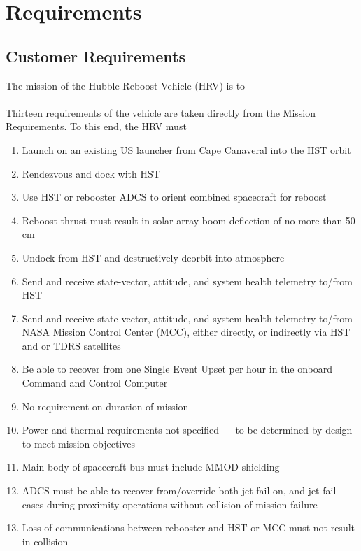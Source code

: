 \documentclass[paper=letter, fontsize=11pt]{scrartcl} %
\numberwithin{equation}{section} %
\numberwithin{figure}{section} %
\numberwithin{table}{section} %
\begin{document}
\section{Requirements} \label{section:reqs}

\subsection{Customer Requirements}

The mission of the Hubble Reboost Vehicle (HRV) is to
 \\
\\
Thirteen requirements of the vehicle are taken directly from the Mission Requirements. To this end, the HRV must
\begin{enumerate}[label=(\alph*)]
    \item Launch on an existing US launcher from Cape Canaveral into the HST orbit
    \item Rendezvous and dock with HST
    \item Use HST or rebooster ADCS to orient combined spacecraft for reboost
    \item Reboost thrust must result in solar array boom deflection of no more than 50 cm
    \item Undock from HST and destructively deorbit into atmosphere
    \item Send and receive state-vector, attitude, and system health telemetry to/from HST
    \item Send and receive state-vector, attitude, and system health telemetry to/from NASA Mission Control Center (MCC), either directly, or indirectly via HST and or TDRS satellites
    \item Be able to recover from one Single Event Upset per hour in the onboard Command and Control Computer
    \item No requirement on duration of mission
    \item Power and thermal requirements not specified --- to be determined by design to meet mission objectives
    \item Main body of spacecraft bus must include MMOD shielding
    \item ADCS must be able to recover from/override both jet-fail-on, and jet-fail cases during proximity operations without collision of mission failure
    \item Loss of communications between rebooster and HST or MCC must not result in collision
\end{enumerate}
\end{document}
